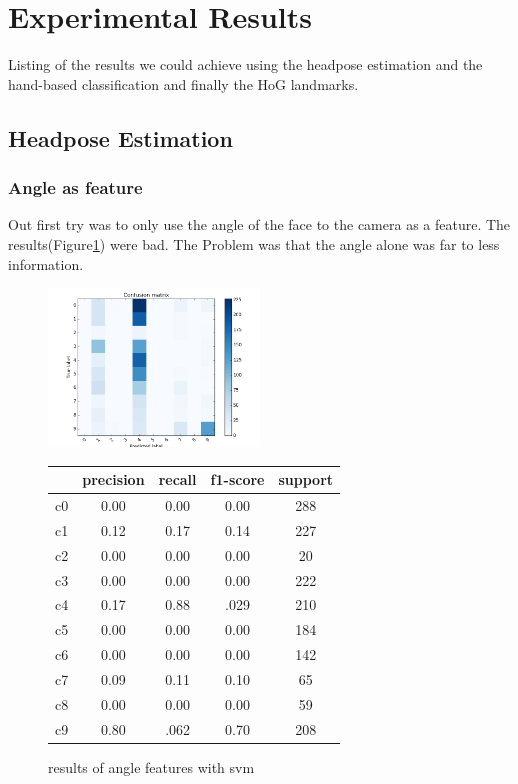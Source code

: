 \documentclass[10pt,twocolumn,letterpaper]{article}
\begin{document}
\section{Experimental Results}
Listing of the results we could achieve using the headpose estimation and the hand-based classification and finally the HoG landmarks.
\subsection{Headpose Estimation}
	\subsubsection{Angle as feature}
	Out first try was to only use the angle of the face to the camera as a feature. The results(Figure\ref{headpose_feature}) were bad. The Problem was that the angle alone was far to less information.
	\begin{figure}[h]
	\centering
	\includegraphics[width=0.5\textwidth]{angle_only}\hspace{0.01\textwidth}
	\begin{tabular}{c||c|c|c|c}
	  & precision&recall&f1-score&support\\	\hline
	 c0&0.00&0.00&0.00&288\\
	 c1&0.12&0.17&0.14&227\\
	 c2&0.00&0.00&0.00&20\\
	 c3&0.00&0.00&0.00&222\\
	 c4&0.17&0.88&.029&210\\
	 c5&0.00&0.00&0.00&184\\
	 c6&0.00&0.00&0.00&142\\
	 c7&0.09&0.11&0.10&65\\
	 c8&0.00&0.00&0.00&59\\
	 c9&0.80&.062&0.70&208
	\end{tabular}
	\caption{results of angle features with svm}
	\label{headpose_feature}
	\end{figure}
\end{document}
